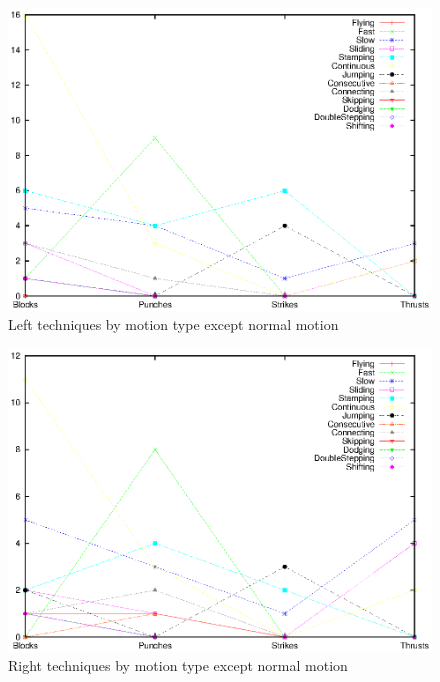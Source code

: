 \documentclass[10pt,twocolumn,a4paper]{article}
\begin{document}
  \begin{figure}
    \includegraphics[scale=0.72]{data/gnuplot/eps/motion_left_not_n}
    \caption{Left techniques by motion type except normal motion}
    \label{fig:motion_left_not_n}
  \end{figure}

  \begin{figure}
    \includegraphics[scale=0.72]{data/gnuplot/eps/motion_right_not_n}
    \caption{Right techniques by motion type except normal motion}
    \label{fig:motion_right_not_n}
  \end{figure}
\end{document}
